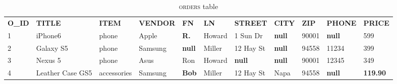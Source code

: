 \documentclass{vldb}
\begin{document}
\begin{table*}[h]

\begin{tabular}{@{}lllllllllll@{}}
\rowcolor[HTML]{C0C0C0} 
\textbf{O\_ID} & \textbf{TITLE}   & \textbf{ITEM} & \textbf{VENDOR} & \textbf{FN}                          & \textbf{LN} & \textbf{STREET}                     & \textbf{CITY}                        & \textbf{ZIP} & \textbf{PHONE}                       & \textbf{PRICE}                         \\
1              & iPhone6          & phone         & Apple           & {\color[HTML]{6200C9} \textbf{R.}}   & Howard      & 1 Sun Dr                            & {\color[HTML]{FE0000} \textbf{null}} & 90001        & {\color[HTML]{FE0000} \textbf{null}} & 599                                    \\
2              & Galaxy S5        & phone         & Samsung         & {\color[HTML]{FE0000} \textbf{null}} & Miller      & 12 Hay St                           & {\color[HTML]{FE0000} \textbf{null}} & 94558        & 11234                                & 399                                    \\
3              & Nexus 5          & phone         & Asus            & Ron                                  & Howard      & {\color[HTML]{FE0000} \textbf{null}} & {\color[HTML]{FE0000} \textbf{null}} & 90001        & 12345                                & 349                                    \\
4              & Leather Case GS5 & accessories   & Samsung         & {\color[HTML]{6200C9} \textbf{Bob}}  & Miller      & 12 Hay St                           & Napa                                 & 94558        & {\color[HTML]{FE0000} \textbf{null}} & {\color[HTML]{6200C9} \textbf{119.90}}
\end{tabular}
\caption{\textsc{orders} table}
\end{table*}
\end{document}
